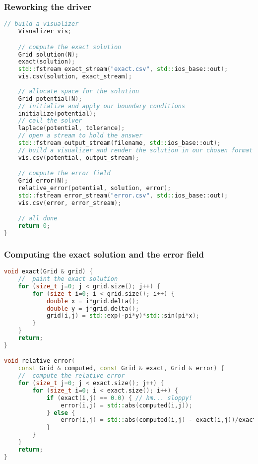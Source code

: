\begin{frame}[fragile]
%
  \frametitle{Reworking the driver}
%
  \begin{lstlisting}[language=c++,basicstyle=\tt\bfseries\tiny,name=seq:driver,firstnumber=239]
    // build a visualizer
    Visualizer vis;

    // compute the exact solution
    Grid solution(N);
    exact(solution);
    std::fstream exact_stream("exact.csv", std::ios_base::out);
    vis.csv(solution, exact_stream);
    
    // allocate space for the solution
    Grid potential(N);
    // initialize and apply our boundary conditions
    initialize(potential);
    // call the solver
    laplace(potential, tolerance);
    // open a stream to hold the answer
    std::fstream output_stream(filename, std::ios_base::out);
    // build a visualizer and render the solution in our chosen format
    vis.csv(potential, output_stream);

    // compute the error field
    Grid error(N);
    relative_error(potential, solution, error);
    std::fstream error_stream("error.csv", std::ios_base::out);
    vis.csv(error, error_stream);

    // all done
    return 0;
}
  \end{lstlisting}
%
\end{frame}

\begin{frame}[fragile]
% 
  \frametitle{Computing the exact solution and the error field}
%
  \begin{lstlisting}[language=c++,firstnumber=143]
void exact(Grid & grid) {
    //  paint the exact solution
    for (size_t j=0; j < grid.size(); j++) {
        for (size_t i=0; i < grid.size(); i++) {
            double x = i*grid.delta();
            double y = j*grid.delta();
            grid(i,j) = std::exp(-pi*y)*std::sin(pi*x);
        }
    }
    return;
}

void relative_error(
    const Grid & computed, const Grid & exact, Grid & error) {
    //  compute the relative error
    for (size_t j=0; j < exact.size(); j++) {
        for (size_t i=0; i < exact.size(); i++) {
            if (exact(i,j) == 0.0) { // hm... sloppy!
                error(i,j) = std::abs(computed(i,j));
            } else {
                error(i,j) = std::abs(computed(i,j) - exact(i,j))/exact(i,j);
            }
        }
    }
    return;
}

  \end{lstlisting}
%
\end{frame}

